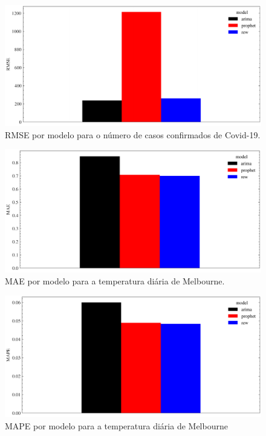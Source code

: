 \begin{figure}[!htp]
    \centering
    \includegraphics[width=5.0in]{img/covid_rmse_comparison.pdf}
    \caption{RMSE por modelo para o número de casos confirmados de Covid-19.}
\end{figure}

\begin{figure}[!htp]
    \centering
    \includegraphics[width=5.0in]{img/temperatures_mae_comparison.pdf}
    \caption{MAE por modelo para a temperatura diária de Melbourne.}
\end{figure}

\begin{figure}[!htp]
    \centering
    \includegraphics[width=5.0in]{img/temperatures_mape_comparison.pdf}
    \caption{MAPE por modelo para a temperatura diária de Melbourne}
\end{figure}

